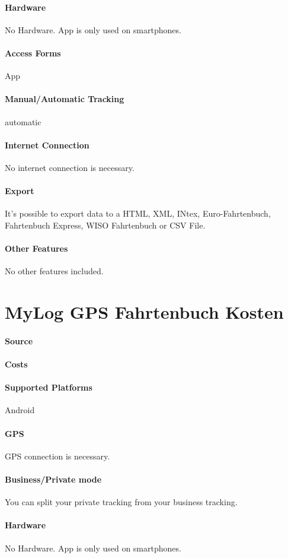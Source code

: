\paragraph{Hardware} No Hardware. App is only used on smartphones.
\paragraph{Access Forms} App
\paragraph{Manual/Automatic Tracking} automatic
\paragraph{Internet Connection} No internet connection is necessary.
\paragraph{Export} It’s possible to export data to a HTML, XML, INtex, Euro-Fahrtenbuch, Fahrtenbuch Express, WISO Fahrtenbuch or CSV File.
\paragraph{Other Features} No other features included.
\newpage
\section{MyLog GPS Fahrtenbuch Kosten}
\paragraph{Source} 
\paragraph{Costs} 
\paragraph{Supported Platforms} Android
\paragraph{GPS} GPS connection is necessary.
\paragraph{Business/Private mode} You can split your private tracking from your business tracking.
\paragraph{Hardware} No Hardware. App is only used on smartphones.
